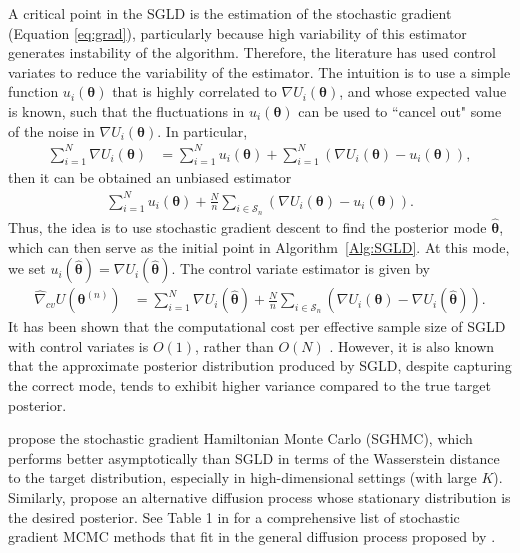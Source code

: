A critical point in the SGLD is the estimation of the stochastic gradient (Equation \ref{eq:grad}), particularly because high variability of this estimator generates instability of the algorithm. Therefore, the literature has used control variates to reduce the variability of the estimator. The intuition is to use a simple function $u_i(\boldsymbol{\theta})$ that is highly correlated to $\nabla U_i(\boldsymbol{\theta})$, and whose expected value is known, such that the fluctuations in $u_i(\boldsymbol{\theta})$ can be used to ``cancel out" some of the noise in $\nabla U_i(\boldsymbol{\theta})$. In particular, 
\begin{align*}
	\sum_{i=1}^N \nabla U_i(\boldsymbol{\theta})&=\sum_{i=1}^N u_i(\boldsymbol{\theta}) + \sum_{i=1}^N (\nabla U_i(\boldsymbol{\theta})-u_i(\boldsymbol{\theta})),
\end{align*} 
then it can be obtained an unbiased estimator
\begin{align*}
	\sum_{i=1}^N u_i(\boldsymbol{\theta}) + \frac{N}{n}\sum_{i\in\mathcal{S}_n} (\nabla U_i(\boldsymbol{\theta})-u_i(\boldsymbol{\theta})).
\end{align*} 
Thus, the idea is to use stochastic gradient descent to find the posterior mode \( \hat{\boldsymbol{\theta}} \), which can then serve as the initial point in Algorithm~\ref{Alg:SGLD}. At this mode, we set \( u_i(\hat{\boldsymbol{\theta}}) = \nabla U_i(\hat{\boldsymbol{\theta}}) \). The control variate estimator is given by
\begin{align*}
	\hat{\nabla}_{cv}U(\boldsymbol{\theta}^{(n)}) &= \sum_{i=1}^N \nabla U_i(\hat{\boldsymbol{\theta}}) + \frac{N}{n} \sum_{i \in \mathcal{S}_n} \left( \nabla U_i(\boldsymbol{\theta}) - \nabla U_i(\hat{\boldsymbol{\theta}}) \right).
\end{align*}
It has been shown that the computational cost per effective sample size of SGLD with control variates is \( O(1) \), rather than \( O(N) \) \cite{nemeth2021stochastic}. However, it is also known that the approximate posterior distribution produced by SGLD, despite capturing the correct mode, tends to exhibit higher variance compared to the true target posterior.

\cite{chen2014stochastic} propose the stochastic gradient Hamiltonian Monte Carlo (SGHMC), which performs better asymptotically than SGLD in terms of the Wasserstein distance to the target distribution, especially in high-dimensional settings (with large \( K \)). Similarly, \cite{ma2015complete} propose an alternative diffusion process whose stationary distribution is the desired posterior. See Table 1 in \cite{nemeth2021stochastic} for a comprehensive list of stochastic gradient MCMC methods that fit in the general diffusion process proposed by \cite{ma2015complete}.

